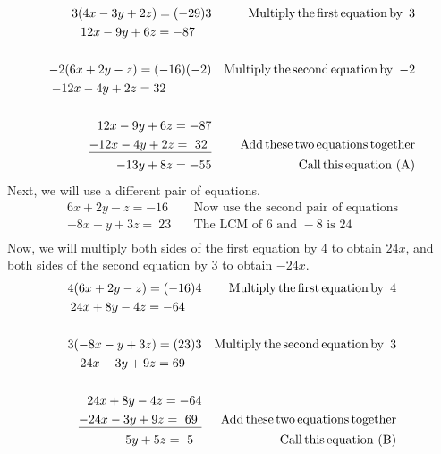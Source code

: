 \begin{example}
	\begin{eqnarray*}
    3 (4 x - 3 y + 2 z) = (- 29) 3 &  & \operatorname{Multiply} \operatorname{the}
    \operatorname{first} \operatorname{equation} \operatorname{by~} 3\\
    12 x - 9 y + 6 z = - 87~~~~ &  & \\
    &  & \\
    - 2 (6 x + 2 y - z) = (- 16) (- 2) &  & \operatorname{Multiply} \operatorname{the}
    \operatorname{second} \operatorname{equation} \operatorname{by~} - 2\\
    - 12 x - 4 y + 2 z = 32~~~~~~~~~~~ &  & \\
    &  & \\
    12 x - 9 y + 6 z = - 87 &  & \\
    \underline{- 12 x - 4 y + 2 z = ~32~} &  & \operatorname{Add} \operatorname{these} \operatorname{two}
    \operatorname{equations} \operatorname{together}\\
    - 13 y + 8 z = - 55 &  & \operatorname{Call} \operatorname{this} \operatorname{equation~(A)}\\
\end{eqnarray*}
Next, we will use a different pair of equations.
\begin{eqnarray*}
    6 x + 2 y - z = - 16 &  & \text{Now~use~the~second~pair~of~equations}\\
    - 8 x - y + 3 z = ~23~ &  & \text{The~LCM~of~} 6 \text{~and~} - 8
    \text{~is~} 24\\
\end{eqnarray*}
		Now, we will multiply both sides of the first equation by 4 to obtain $24x$, and both sides of the second equation by 3 to obtain $-24x$.
\begin{eqnarray*}
    4 (6 x + 2 y - z) = (- 16) 4 &  & \operatorname{Multiply} \operatorname{the} \operatorname{first}
    \operatorname{equation} \operatorname{by~} 4\\
    24 x + 8 y - 4z = - 64~~~~ &  & \\
    &  & \\
    3 (- 8 x - y + 3 z) = (23) 3 &  & \operatorname{Multiply} \operatorname{the} \operatorname{second}
    \operatorname{equation} \operatorname{by~} 3\\
    - 24 x - 3 y + 9 z = 69~~~~ &  & \\
    &  & \\
    24 x + 8 y - 4z = - 64 &  & \\
    \underline{- 24 x - 3 y + 9 z = ~69~} &  & \operatorname{Add} \operatorname{these} \operatorname{two}
    \operatorname{equations} \operatorname{together}\\
    5 y + 5 z = ~5~~ &  & \operatorname{Call} \operatorname{this} \operatorname{equation~(B)}\\
  \end{eqnarray*}

\end{example}
